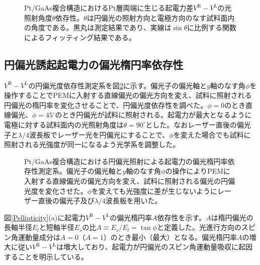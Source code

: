 \begin{figure}[tbp]
\begin{center}
\caption{Pt/GaAs複合構造におけるPt層両端に生じる起電力差$V^\text{R}-V^\text{L}$の光照射角度$\theta$依存性。$\theta$は円偏光の照射方向と電極方向のなす試料面内の角度である。黒丸は測定結果であり、実線は$\sin\theta$に比例する関数によるフィッティング結果である。 }
\label{Pangle} 
\end{center}
\end{figure}


\subsection{円偏光誘起起電力の偏光楕円率依存性}\label{daendaern}

$V^\text{R}-V^\text{L}$の円偏光度依存性測定系を図\ref{ellipsetup}に示す。偏光子の偏光軸と$y$軸のなす角$\phi$を操作することでPEMに入射する直線偏光の偏光方向を変え、試料に照射される円偏光の楕円率を変化させることで、円偏光度依存性を調べた。$\phi=0$のとき直線偏光、$\phi=45^\circ$のとき円偏光が試料に照射される。起電力が最大となるように電極に対する試料面内の光照射角度は$\theta=90^\circ$とした。なおレーザー直後の偏光子と$\lambda/4$波長板でレーザー光を円偏光にすることで、$\phi$を変えた場合でも試料に照射される光強度が同一になるよう光学系を調整した。


\begin{figure}[h]
\begin{center}
\caption{Pt/GaAs複合構造における円偏光照射による起電力の偏光楕円率依存性測定系。偏光子の偏光軸と$y$軸のなす角$\phi$の操作によりPEMに入射する直線偏光の偏光方向を変え、試料に照射される偏光の円偏光度を変化させた。$\phi$を変えても光強度に差が生じないようにレーザー直後の偏光子及び$\lambda/4$波長板を用いた。 }
\label{ellipsetup} 
\end{center}
\end{figure}



図\ref{Pellipticity}(a)に起電力$V^\text{R}-V^\text{L}$の偏光楕円率$A$依存性を示す。$A$は楕円偏光の長軸半径$E_l$と短軸半径$E_s$の比$A\equiv E_s/E_l=\tan\phi$と定義した。光進行方向のスピン角運動量成分は$A=0$（$A=1$）のとき最小（最大）となる。偏光楕円率$A$の増大に従い$V^\text{R}-V^\text{L}$は増大しており、起電力が円偏光のスピン角運動量吸収に起因することを明示している。




